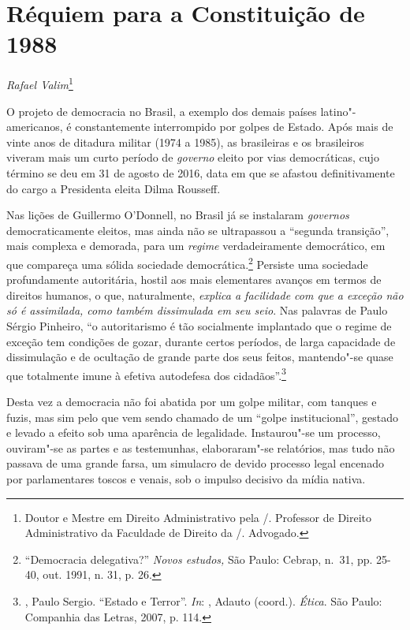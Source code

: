 \chapter*{Réquiem para a Constituição de 1988}


\begin{flushright}
\emph{Rafael Valim}\footnote{Doutor e Mestre em Direito Administrativo
pela /. Professor de Direito Administrativo da Faculdade de Direito
da /. Advogado.}
\end{flushright}

O projeto de democracia no Brasil, a exemplo dos demais países
latino"-americanos, é constantemente interrompido por golpes de Estado.
Após mais de vinte anos de ditadura militar (1974 a 1985), as
brasileiras e os brasileiros viveram mais um curto período de
\emph{governo} eleito por vias democráticas, cujo término se deu em 31
de agosto de 2016, data em que se afastou definitivamente do cargo a
Presidenta eleita Dilma Rousseff.

Nas lições de Guillermo O'Donnell, no Brasil já se instalaram
\emph{governos} democraticamente eleitos, mas ainda não se ultrapassou a
``segunda transição'', mais complexa e demorada, para um \emph{regime}
verdadeiramente democrático, em que compareça uma sólida sociedade
democrática.\footnote{``Democracia delegativa?'' \emph{Novos estudos,}
  São Paulo: Cebrap, n.~31, pp. 25-40, out. 1991, n. 31, p. 26.}
Persiste uma sociedade profundamente autoritária, hostil aos mais
elementares avanços em termos de direitos humanos, o que, naturalmente,
\emph{explica a facilidade com que a exceção não só é assimilada, como
também dissimulada em seu seio}. Nas palavras de Paulo Sérgio Pinheiro,
``o autoritarismo é tão socialmente implantado que o regime de exceção
tem condições de gozar, durante certos períodos, de larga capacidade de
dissimulação e de ocultação de grande parte dos seus feitos, mantendo"-se
quase que totalmente imune à efetiva autodefesa dos
cidadãos''.\footnote{, Paulo Sergio. ``Estado e Terror''.
  \emph{In}: , Adauto (coord.). \emph{Ética}. São Paulo: Companhia
  das Letras, 2007, p. 114.}

Desta vez a democracia não foi abatida por um golpe militar, com tanques
e fuzis, mas sim pelo que vem sendo chamado de um ``golpe
institucional'', gestado e levado a efeito sob uma aparência de
legalidade. Instaurou"-se um processo, ouviram"-se as partes e as
testemunhas, elaboraram"-se relatórios, mas tudo não passava de uma
grande farsa, um simulacro de devido processo legal encenado por
parlamentares toscos e venais, sob o impulso decisivo da mídia nativa.

